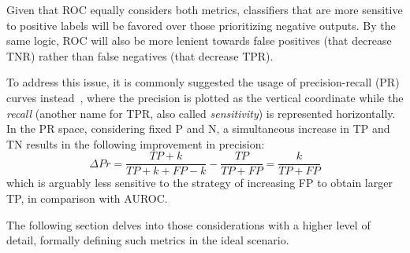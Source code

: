 
Given that ROC equally considers both metrics, classifiers that are more sensitive to positive labels will be favored over those prioritizing negative outputs. By the same logic, ROC will also be more lenient towards false positives (that decrease TNR) rather than false negatives (that decrease TPR).

To address this issue, it is commonly suggested the usage of precision-recall (PR) curves instead~\cite{ozenne2015precision,he2009learning}, where the precision is plotted as the vertical coordinate while the \emph{recall} (another name for TPR, also called \emph{sensitivity}) is represented horizontally. In the PR space, considering fixed P and N, a simultaneous increase in TP and TN results in the following improvement in precision:
%
\begin{equation}
    \Delta Pr =
    \frac{TP + k}{TP + k + FP - k}
    - \frac{TP}{TP + FP}
    = \frac{k}{TP + FP}
\end{equation}
%
which is arguably less sensitive to the strategy of increasing FP to obtain larger TP, in comparison with AUROC. %

The following section delves into those considerations with a higher level of detail, formally defining such metrics in the ideal scenario.



% 


